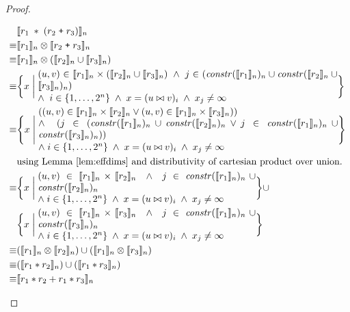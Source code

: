 \begin{proof}
\begin{description}
    \begin{align*}
             & \interp{r_1 \; \ast \; (r_2 \; \texttt{+} \; r_3)}_n \\
      \equiv & \interp{r_1}_n \otimes \interp{r_2 \; \texttt{+} \; r_3}_n \\
      \equiv & \interp{r_1}_n \otimes (\interp{r_2}_n \cup \interp{r_3}_n) \\
      \equiv &
  \bigg\{x \; \bigg| \;
    \parbox{11cm}{$(u, v) \in \interp{r_1}_n \times (\interp{r_2}_n \cup \interp{r_3}_n)
                  \; \wedge \; j \in (\effdims{\interp{r_1}_n}{n} \cup
                   \effdims{\interp{r_2}_n \cup \interp{r_3}_n}{n})$\\[0.1em]
                  $\;\; \wedge \;\; i \in \{1, \ldots, 2^n\} \; \wedge
                  \; x = (u \bowtie v)_i \; \wedge \; x_j \neq \infty$
                  } \bigg\} \\
      \equiv & 
  \Bigg\{x \; \Bigg| \;
    \parbox{11cm}{$((u, v) \in \interp{r_1}_n \times \interp{r_2}_n \vee (u, v) \in \interp{r_1}_n \times \interp{r_3}_n)) \\
                  \; \wedge \; (j \in (\effdims{\interp{r_1}_n}{n} \cup
                  \effdims{\interp{r_2}_n}{n} \vee j \in \effdims{\interp{r_1}_n}{n} \cup \effdims{\interp{r_3}_n}{n}))$\\[0.1em]
                  $\; \wedge \; i \in \{1, \ldots, 2^n\} \; \wedge
                  \; x = (u \bowtie v)_i \; \wedge \; x_j \neq \infty$
                  } \Bigg\} \\
             & \mbox{using Lemma~\ref{lem:effdims} and distributivity of cartesian product over union.} \\
      \equiv &
  \bigg\{x \; \bigg| \;
    \parbox{8cm}{$(u, v) \in \interp{r_1}_n \times \interp{r_2}_n
                  \; \wedge \; j \in \effdims{\interp{r_1}_n}{n} \cup \effdims{\interp{r_2}_n}{n}$ \\
                  $\; \wedge \; i \in \{1, \ldots, 2^n\} \; \wedge
                  \; x = (u \bowtie v)_i \; \wedge \; x_j \neq \infty$
                  } \bigg\} \cup \\
  & \bigg\{x \; \bigg| \;
    \parbox{8cm}{$(u, v) \in \interp{r_1}_n \times \interp{r_3}_n
                  \; \wedge \; j \in \effdims{\interp{r_1}_n}{n} \cup \effdims{\interp{r_3}_n}{n}$ \\
                  $\; \wedge \; i \in \{1, \ldots, 2^n\} \; \wedge
                  \; x = (u \bowtie v)_i \; \wedge \; x_j \neq \infty$
                  } \bigg\} \\
      \equiv & (\interp{r_1}_n \otimes \interp{r_2}_n)
        \cup (\interp{r_1}_n \otimes \interp{r_3}_n) \\
      \equiv & (\interp{r_1 \ast r_2}_n) \cup (\interp{r_1 \ast r_3}_n) \\
      \equiv & \interp{r_1 \ast r_2 + r_1 \ast r_3}_n \\
    \end{align*}
\end{description}
\end{proof}
